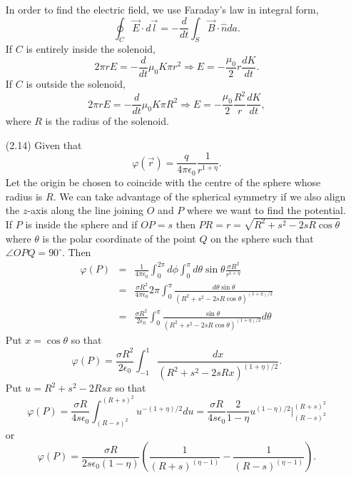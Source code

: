\documentclass{article}
\newcommand{\un}{\hat{n}}
\begin{document}
\begin{enumerate}
In order to find the electric field, we use Faraday's law in integral form,
\[
\oint_C \vec{E}\cdot d\vec{l} = -\frac{d}{dt}\int_S \vec{B}\cdot\un da.
\]
If $C$ is entirely inside the solenoid, 
\[
2\pi r E = -\frac{d}{dt}\mu_0 K \pi r^2 \Rightarrow E = -\frac{\mu_0}{2}r \frac{dK}{dt}.
\]
If $C$ is outside the solenoid,
\[
2\pi r E = -\frac{d}{dt}\mu_0 K \pi R^2 \Rightarrow E = -\frac{\mu_0}{2}\frac{R^2}{r} \frac{dK}{dt},
\]
where $R$ is the radius of the solenoid.

\item[(2.14)] Given that
\[
\varphi(\vec{r}) = \frac{q}{4\pi\epsilon_0}\frac{1}{r^{1+\eta}}.
\]
Let the origin be chosen to coincide with the centre of the sphere whose radius is $R$. We can take advantage of the
spherical symmetry if we also align the $z$-axis along the line joining $O$ and $P$ where we want to find the potential. If $P$
is inside the sphere and if $OP = s$ then $PR = r = \sqrt{R^2 + s^2 - 2sR\cos\theta}$ where $\theta$ is the polar coordinate of
the point $Q$ on the sphere such that $\angle OPQ = 90^\circ$. Then
\begin{eqnarray*}
\varphi(P) &=& \frac{1}{4\pi\epsilon_0}\int_0^{2\pi}d\phi \int_0^\pi d\theta \sin\theta\frac{\sigma R^2}{r^{1+\eta}} \\
 &=& \frac{\sigma R^2}{4\pi\epsilon_0} 2\pi \int_0^\pi \frac{d\theta \sin\theta}{(R^2 + s^2 - 2sR\cos\theta)^{(1 + \eta)/2}} \\
 &=& \frac{\sigma R^2}{2\epsilon_0} \int_0^\pi \frac{\sin\theta}{(R^2 + s^2 - 2sR\cos\theta)^{(1 + \eta)/2}}d\theta
\end{eqnarray*}
Put $x = \cos\theta$ so that
\[
\varphi(P) = \frac{\sigma R^2}{2\epsilon_0}\int_{-1}^1 \frac{dx}{(R^2 + s^2 - 2sRx)^{(1 + \eta)/2}}.
\]
Put $u = R^2 + s^2 - 2Rsx$ so that
\[
\varphi(P) = \frac{\sigma R}{4s\epsilon_0}\int_{(R-s)^2}^{(R+s)^2} u^{-(1 + \eta)/2}du = 
\frac{\sigma R}{4s\epsilon_0}\frac{2}{1 - \eta}u^{(1 - \eta)/2}\Big|_{(R-s)^2}^{(R+s)^2}
\]
or
\[
\varphi(P) = \frac{\sigma R}{2s\epsilon_0(1 - \eta)}\left(\frac{1}{(R+s)^{(\eta - 1)}} - \frac{1}{(R-s)^{(\eta - 1)}}\right).
\]
\end{enumerate}
\end{document}
